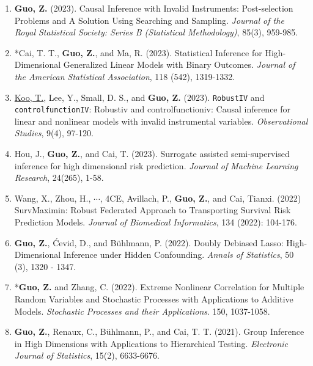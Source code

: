 \documentclass[margin, line]{res}
\begin{document}
\begin{resume}
\begin{enumerate}
			\item {\bf Guo, Z.} (2023). Causal Inference with Invalid Instruments: Post-selection
				Problems and A Solution Using Searching and Sampling.
				{\it Journal of the Royal Statistical Society: Series B (Statistical Methodology)},
				85(3), 959-985.

			\item {*}Cai, T. T., {\bf Guo, Z.}, and Ma, R. (2023). Statistical
				Inference for High-Dimensional Generalized Linear Models with Binary
				Outcomes. {\it Journal of the American Statistical Association}, 118 (542),
				1319-1332.

			\item \underline{Koo, T.}, {Lee, Y.}, Small, D. S., and {\bf Guo, Z.} (2023).
				\texttt{RobustIV} and \texttt{controlfunctionIV}: Robustiv and
				controlfunctioniv: Causal inference for linear and nonlinear models with
				invalid instrumental variables. {\it Observational Studies}, 9(4), 97-120.

			\item Hou, J., {\bf Guo, Z.}, and Cai, T. (2023). Surrogate assisted semi-supervised
				inference for high dimensional risk prediction. {\it Journal of Machine Learning Research},
				24(265), 1-58.
			
			\item Wang, X., Zhou, H., $\cdots$, 4CE, Avillach, P.\Envelope, {\bf Guo, Z.}\Envelope,
				and Cai, Tianxi\Envelope. (2022) SurvMaximin: Robust Federated Approach to
				Transporting Survival Risk Prediction Models.
				{\it Journal of Biomedical Informatics}, 134 (2022): 104-176. 

			\item {\bf Guo, Z.}, \'{C}evid, D., and B\"{u}hlmann, P. (2022). Doubly Debiased
				Lasso: High-Dimensional Inference under Hidden Confounding. {\it Annals of Statistics},
				50 (3), 1320 - 1347. 

			\item {*}{\bf Guo, Z.} and Zhang, C. (2022). Extreme Nonlinear Correlation
				for Multiple Random Variables and Stochastic Processes with Applications
				to Additive Models. {\it Stochastic Processes and their Applications}. 150,
				1037-1058. 

			\item {\bf Guo, Z.}, Renaux, C., B\"{u}hlmann, P., and Cai, T. T. (2021). Group
				Inference in High Dimensions with Applications to Hierarchical Testing.
				{\it Electronic Journal of Statistics}, 15(2), 6633-6676. %


\end{enumerate}
\end{resume}
\end{document}
